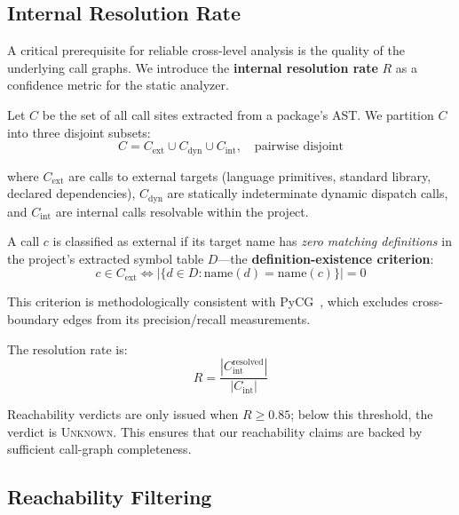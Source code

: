 \documentclass[conference]{IEEEtran}
\begin{document}
\subsection{Internal Resolution Rate}
\label{subsec:resolution-rate}

A critical prerequisite for reliable cross-level analysis is the quality of the underlying call graphs. We introduce the \textbf{internal resolution rate} $R$ as a confidence metric for the static analyzer.

Let $C$ be the set of all call sites extracted from a package's AST. We partition $C$ into three disjoint subsets:
\begin{equation}
    C = C_{\mathrm{ext}} \cup C_{\mathrm{dyn}} \cup C_{\mathrm{int}}, \quad \text{pairwise disjoint}
\end{equation}

\noindent where $C_{\mathrm{ext}}$ are calls to external targets (language primitives, standard library, declared dependencies), $C_{\mathrm{dyn}}$ are statically indeterminate dynamic dispatch calls, and $C_{\mathrm{int}}$ are internal calls resolvable within the project.

A call $c$ is classified as external if its target name has \emph{zero matching definitions} in the project's extracted symbol table $D$—the \textbf{definition-existence criterion}:
\begin{equation}
    c \in C_{\mathrm{ext}} \iff |\{d \in D : \mathrm{name}(d) = \mathrm{name}(c)\}| = 0
\end{equation}

This criterion is methodologically consistent with PyCG~\cite{salis2021pycg}, which excludes cross-boundary edges from its precision/recall measurements.

The resolution rate is:
\begin{equation}
    \label{eq:resolution}
    R = \frac{|C_{\mathrm{int}}^{\mathrm{resolved}}|}{|C_{\mathrm{int}}|}
\end{equation}

Reachability verdicts are only issued when $R \geq 0.85$; below this threshold, the verdict is \textsc{Unknown}. This ensures that our reachability claims are backed by sufficient call-graph completeness.

\subsection{Reachability Filtering}
\label{subsec:reachability}
\end{document}
